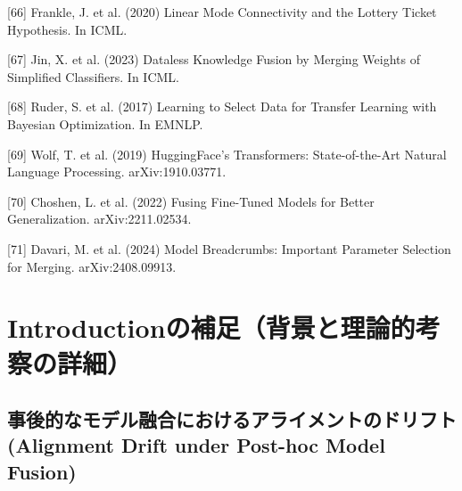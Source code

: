 \documentclass{article}
\begin{document}
{[66] Frankle, J. et al. (2020) Linear Mode Connectivity and the Lottery Ticket Hypothesis. In ICML.

[67] Jin, X. et al. (2023) Dataless Knowledge Fusion by Merging Weights of Simplified Classifiers. In ICML.

[68] Ruder, S. et al. (2017) Learning to Select Data for Transfer Learning with Bayesian Optimization. In EMNLP.

[69] Wolf, T. et al. (2019) HuggingFace's Transformers: State-of-the-Art Natural Language Processing. arXiv:1910.03771.

[70] Choshen, L. et al. (2022) Fusing Fine-Tuned Models for Better Generalization. arXiv:2211.02534.

[71] Davari, M. et al. (2024) Model Breadcrumbs: Important Parameter Selection for Merging. arXiv:2408.09913.
}


\newpage
\appendix



\section{Introductionの補足（背景と理論的考察の詳細）}
\label{app:introduction}
\subsection{事後的なモデル融合におけるアライメントのドリフト(Alignment Drift under Post-hoc Model Fusion)
}


\end{document}
